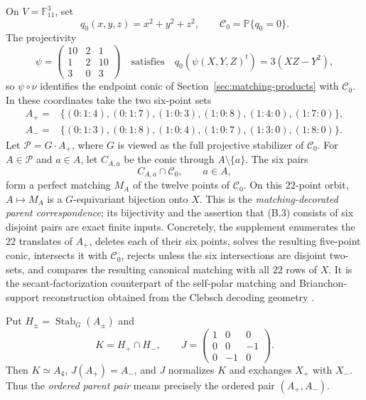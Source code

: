 \documentclass[11pt]{article}
\theoremstyle{definition}
\theoremstyle{remark}
\newcommand{\F}{\mathbb{F}}
\newcommand{\cC}{\mathcal{C}}
\begin{document}
On
\(V=\F_{11}^3\), set
\[
 q_0(x,y,z)=x^2+y^2+z^2,\qquad
 \cC_0=\mathbb P\{q_0=0\}.
\]
The projectivity
\[
 \psi=
 \begin{pmatrix}10&2&1\\1&2&10\\3&0&3\end{pmatrix}
 \quad\text{satisfies}\quad
 q_0(\psi(X,Y,Z)^t)=3(XZ-Y^2),                         \tag{B.1}
\]
so \(\psi\circ\nu\) identifies the endpoint conic of
Section~\ref{sec:matching-products} with
\(\cC_0\).  In these coordinates take the two six-point sets
\[
\begin{aligned}
A_+={}&\{(0:1:4),(0:1:7),(1:0:3),(1:0:8),
          (1:4:0),(1:7:0)\},\\
A_-={}&\{(0:1:3),(0:1:8),(1:0:4),(1:0:7),
          (1:3:0),(1:8:0)\}.
\end{aligned}                                           \tag{B.2}
\]
Let \(\mathcal P=G\cdot A_+\), where \(G\) is viewed as the full
projective stabilizer of \(\cC_0\).  For \(A\in\mathcal P\) and
\(a\in A\), let \(C_{A,a}\) be the conic through
\(A\setminus\{a\}\).  The six pairs
\[
 C_{A,a}\cap\cC_0,\qquad a\in A,                        \tag{B.3}
\]
form a perfect matching \(M_A\) of the twelve points of \(\cC_0\).
On this \(22\)-point orbit, \(A\mapsto M_A\) is a
\(G\)-equivariant bijection onto \(X\).  This is the
\emph{matching-decorated parent correspondence}; its bijectivity and
the assertion that (B.3) consists of six disjoint pairs are exact
finite inputs.  Concretely, the supplement enumerates the \(22\) translates
of \(A_+\), deletes each of their six points, solves the resulting
five-point conic, intersects it with \(\cC_0\), rejects unless the six
intersections are disjoint two-sets, and compares the resulting canonical
matching with all \(22\) rows of \(X\).  It is the secant-factorization counterpart of the
self-polar matching and Brianchon-support reconstruction obtained from
the Clebsch decoding geometry \cite{RuddRigidity2026}.

Put \(H_\pm=\operatorname{Stab}_G(A_\pm)\) and
\[
 K=H_+\cap H_-,\qquad
 J=\begin{pmatrix}1&0&0\\0&0&-1\\0&-1&0\end{pmatrix}.
                                                               \tag{B.4}
\]
Then \(K\simeq A_4\), \(J(A_+)=A_-\), and \(J\) normalizes \(K\) and
exchanges \(X_+\) with \(X_-\).  Thus the \emph{ordered parent pair}
means precisely the ordered pair \((A_+,A_-)\).
\end{document}

